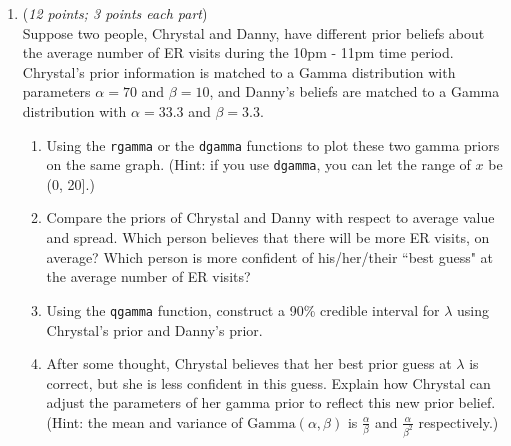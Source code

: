 \documentclass[11pt]{article}
\begin{document}
\begin{enumerate}


    \item
    ({\it{12 points; 3 points each part}}) \\
Suppose two people, Chrystal and Danny, have different prior beliefs about the average number of ER visits during the 10pm - 11pm time period.  Chrystal's prior information is matched to a Gamma distribution with parameters $\alpha = 70$ and $\beta = 10$, and Danny's beliefs are matched to a Gamma distribution with $\alpha = 33.3$ and $\beta = 3.3$.

%

\begin{enumerate}
\item Using the \texttt{rgamma} or the \texttt{dgamma} functions to plot these two gamma priors on the same graph. (Hint: if you use \texttt{dgamma}, you can let the range of $x$ be (0, 20].)

\item Compare the priors of Chrystal and Danny with respect to average value and spread.  Which person believes that there will be more ER visits, on average?  Which person is more confident of his/her/their ``best guess" at the average number of ER visits?

\item Using the \texttt{qgamma} function, construct a 90\% credible interval for $\lambda$ using Chrystal's prior and Danny's prior.

\item After some thought, Chrystal believes that her best prior guess at $\lambda$ is correct, but she is less confident in this guess.  Explain how Chrystal can adjust the parameters of her gamma prior to reflect this new prior belief. (Hint: the mean and variance of $\textrm{Gamma}(\alpha, \beta)$ is $\frac{\alpha}{\beta}$ and $\frac{\alpha}{\beta^2}$ respectively.)

\end{enumerate}



\end{enumerate}
\end{document}
